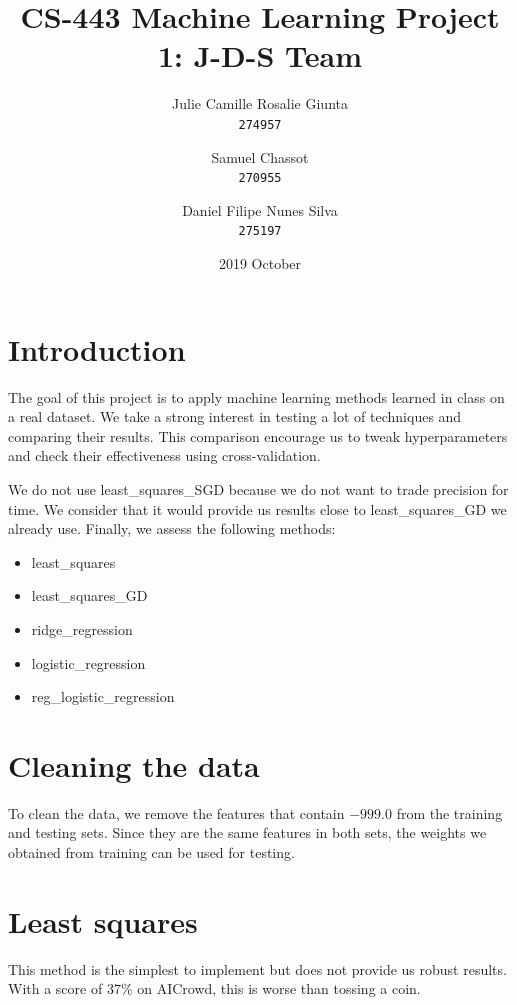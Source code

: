 \documentclass[11pt, a4paper, twocolumn]{article}
\begin{document}
\date{2019 October}
\title{CS-443 Machine Learning Project 1: J-D-S Team}
\author{
  Julie Camille Rosalie Giunta\\
  \texttt{274957}
  \and
  Samuel Chassot\\
  \texttt{270955}
  \and
  Daniel Filipe Nunes Silva\\
  \texttt{275197}
}

\maketitle
\clearpage

\section{Introduction}
The goal of this project is to apply machine learning
methods learned in class on a real dataset. We take a
strong interest in testing a lot of techniques and
comparing their results. This comparison encourage us to
tweak hyperparameters and check their effectiveness using cross-validation.

We do not use least\_squares\_SGD because we do not want
to trade precision for time. We consider
that it would provide us results close to
least\_squares\_GD we already use. Finally, we assess the following
methods:

\begin{itemize}
  \setlength{\itemsep}{1pt}
  \setlength{\parskip}{0pt}
  \setlength{\parsep}{0pt}
  \item least\_squares
  \item least\_squares\_GD 
  \item ridge\_regression
  \item logistic\_regression
  \item reg\_logistic\_regression
\end{itemize}

\section{Cleaning the data}
To clean the data, we remove the features
that contain $-999.0$ from the training and testing sets. 
Since they are the same features in both sets, 
the weights we obtained from training can be used for testing.

\section{Least squares}
This method is the simplest to implement but does not
provide us robust results. With a score of 37\% on
AICrowd, this is worse than tossing a coin.
\end{document}
